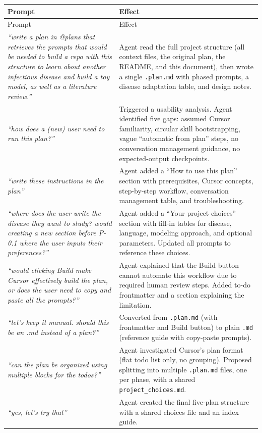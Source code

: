 \documentclass[11pt]{article}
\begin{document}
\begin{longtable}{@{}p{6cm}p{7.3cm}@{}}
\toprule
Prompt & Effect \\
\midrule
\endfirsthead
\toprule
Prompt & Effect \\
\midrule
\endhead
\textit{``write a plan in @plans that retrieves the prompts that would be needed to build a repo with this structure to learn about another infectious disease and build a toy model, as well as a literature review.''} & Agent read the full project structure (all context files, the original plan, the README, and this document), then wrote a single \texttt{.plan.md} with phased prompts, a disease adaptation table, and design notes. \\
\textit{``how does a (new) user need to run this plan?''} & Triggered a usability analysis. Agent identified five gaps: assumed Cursor familiarity, circular skill bootstrapping, vague ``automatic from plan'' steps, no conversation management guidance, no expected-output checkpoints. \\
\textit{``write these instructions in the plan''} & Agent added a ``How to use this plan'' section with prerequisites, Cursor concepts, step-by-step workflow, conversation management table, and troubleshooting. \\
\textit{``where does the user write the disease they want to study? would creating a new section before P-0.1 where the user inputs their preferences?''} & Agent added a ``Your project choices'' section with fill-in tables for disease, language, modeling approach, and optional parameters. Updated all prompts to reference these choices. \\
\textit{``would clicking Build make Cursor effectively build the plan, or does the user need to copy and paste all the prompts?''} & Agent explained that the Build button cannot automate this workflow due to required human review steps. Added to-do frontmatter and a section explaining the limitation. \\
\textit{``let's keep it manual. should this be an .md instead of a plan?''} & Converted from \texttt{.plan.md} (with frontmatter and Build button) to plain \texttt{.md} (reference guide with copy-paste prompts). \\
\textit{``can the plan be organized using multiple blocks for the todos?''} & Agent investigated Cursor's plan format (flat todo list only, no grouping). Proposed splitting into multiple \texttt{.plan.md} files, one per phase, with a shared \texttt{project\_choices.md}. \\
\textit{``yes, let's try that''} & Agent created the final five-plan structure with a shared choices file and an index guide. \\
\bottomrule
\end{longtable}
\end{document}
